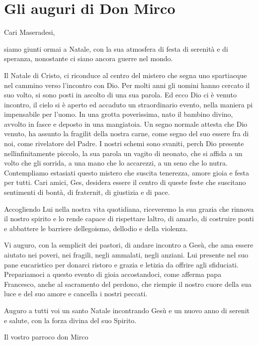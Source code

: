 \documentclass[a5paper,10pt]{article} %
\title{} %
\author{}
\begin{document}
  \maketitle
  
  \clearpage
  
  \clearpage
  
\section{Gli auguri di Don Mirco}
Cari Maseradesi,

siamo giunti ormai a Natale, con la sua atmosfera di festa di serenità e di speranza, nonostante ci siano ancora guerre nel mondo.

Il Natale di Cristo, ci riconduce al centro del mistero che segna uno spartiacque nel cammino verso l'incontro con Dio. Per molti anni gli uomini hanno cercato il suo volto, si sono posti in ascolto di una sua parola. Ed ecco Dio ci è venuto incontro, il cielo si è aperto ed  accaduto un straordinario evento, nella maniera pi impensabile per l'uomo. In una grotta poverissima,  nato il bambino divino, avvolto in fasce e deposto in una mangiatoia. Un segno normale attesta che Dio  venuto, ha assunto la fragilit della nostra carne, come segno del suo essere fra di noi, come rivelatore del Padre. I nostri schemi sono svaniti, perch Dio  presente nellinfinitamente piccolo, la sua parola un vagito di neonato, che si affida a un volto che gli sorrida, a una mano che lo accarezzi, a un seno che lo nutra. Contempliamo estasiati questo mistero che suscita tenerezza, amore gioia e festa per tutti. Cari amici, Ges, desidera essere il centro di queste feste che suscitano sentimenti di bontà, di fraternit, di giustizia e di pace.

Accogliendo Lui nella nostra vita quotidiana, riceveremo la sua grazia che rinnova il nostro spirito e lo rende capace di rispettare laltro, di amarlo, di costruire ponti e abbattere le barriere dellegoismo, dellodio e della violenza.

Vi auguro, con la semplicit dei pastori, di andare incontro a Gesù, che ama essere aiutato nei poveri, nei fragili, negli ammalati, negli anziani. Lui  presente nel suo pane eucaristico per donarci ristoro e grazia e letizia da offrire agli sfiduciati. Prepariamoci a questo evento di gioia accostandoci, come afferma papa Francesco, anche al sacramento del perdono, che riempie il nostro cuore della sua luce e del suo amore e cancella i nostri peccati.

Auguro a tutti voi un santo Natale incontrando Gesù e un nuovo anno di serenit e salute, con la forza divina del suo Spirito.

Il vostro parroco don Mirco
\end{document}
